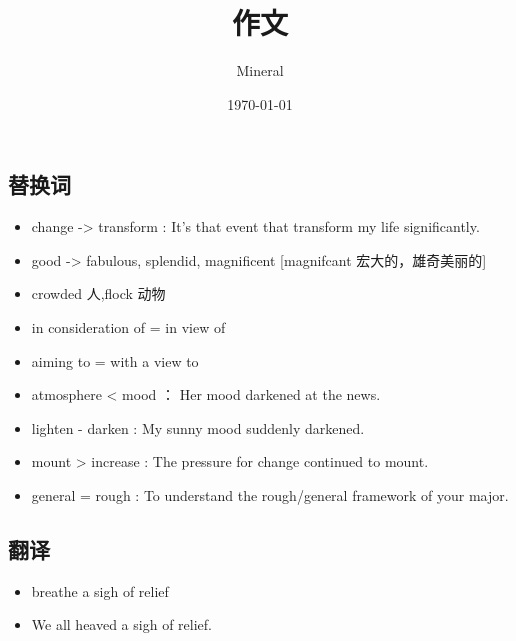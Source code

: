 \documentclass[utf8]{ctexart}
\author{Mineral}
\title{作文}
\date {\today}
\begin{document}
		\maketitle
		\subsection{替换词}
		\begin{itemize}
				\item change -> transform : It's that event that transform my life significantly.
				\item good -> fabulous, splendid, magnificent [magnifcant 宏大的，雄奇美丽的]	
				\item 	crowded 人,flock 动物
				\item in consideration of = in view of
				\item aiming to = with a view to
				\item atmosphere < mood ： Her mood darkened at the news.
				\item lighten - darken : My sunny mood suddenly darkened.
				\item mount > increase : The pressure for change continued to mount.
				\item general = rough : To understand the rough/general framework of your major.
		\end{itemize}
		\subsection{翻译}
		\begin{itemize}
				\item breathe a sigh of relief
				\item We all heaved a sigh of relief.	

		\end{itemize}
\end{document}
